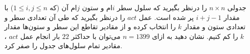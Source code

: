 \EXERCISE
جدولی 
$n \times n$
  را درنظر بگیرید که سلول سطر $i$ام و ستون $j$ام آن (که $1 \leq i,j \leq n$) با مقدار
   $i+j-1$
    پر شده است. عمل $act$ را درنظر بگیرید که طی آن تعدادی سطر و تعدادی ستون و مقدار 
    $k$ 
    را انتخاب کرده و از مقادیر تقاطع این سطر و ستون‌ها مقدار 
    $k$
     را کم کنیم. نشان دهید به ازای 
     $n=1399$ 
     می‌توان با حداکثر 
     $22$ 
     بار انجام عمل 
$act$
، مقادیر تمام سلول‌های جدول را صفر کرد.